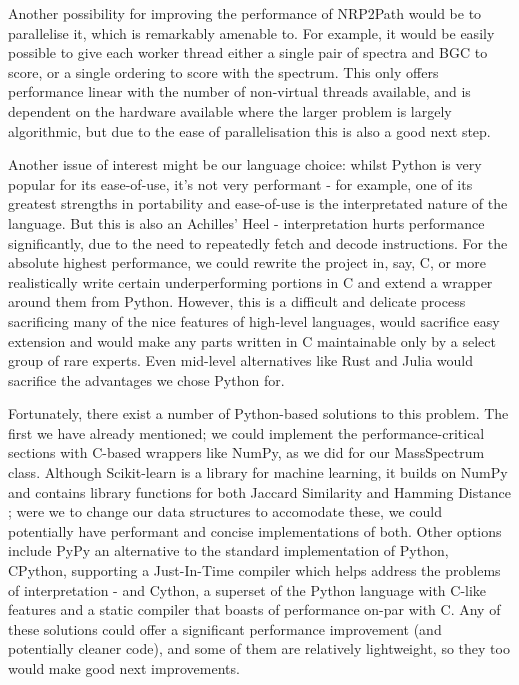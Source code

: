\documentclass{l4proj}
\newcommand{\cit}[1]{\citep{#1}}
\begin{document}
Another possibility for improving the performance of NRP2Path would be to parallelise it, which is remarkably amenable to. For example, it would be easily possible to give each worker thread either a single pair of spectra and BGC to score, or a single ordering to score with the spectrum. This only offers performance linear with the number of non-virtual threads available, and is dependent on the hardware available where the larger problem is largely algorithmic, but due to the ease of parallelisation this is also a good next step.

Another issue of interest might be our language choice: whilst Python is very popular for its ease-of-use, it's not very performant - for example, one of its greatest strengths in portability and ease-of-use is the interpretated nature of the language. But this is also an Achilles' Heel - interpretation hurts performance significantly, due to the need to repeatedly fetch and decode instructions. For the absolute highest performance, we could rewrite the project in, say, C, or more realistically write certain underperforming portions in C and extend a wrapper around them from Python. However, this is a difficult and delicate process sacrificing many of the nice features of high-level languages, would sacrifice easy extension and would make any parts written in C maintainable only by a select group of rare experts. Even mid-level alternatives like Rust \cit{rustlang} and Julia would sacrifice the advantages we chose Python for. 

Fortunately, there exist a number of Python-based solutions to this problem. The first we have already mentioned; we could implement the performance-critical sections with C-based wrappers like NumPy, as we did for our MassSpectrum class. Although Scikit-learn \cit{sklearn} is a library for machine learning, it builds on NumPy and contains library functions for both Jaccard Similarity \cit{skjaccard} and Hamming Distance \cit{skhamming}; were we to change our data structures to accomodate these, we could potentially have performant and concise implementations of both. Other options include PyPy \cit{pypy} an alternative to the standard implementation of Python, CPython, supporting a Just-In-Time compiler which helps address the problems of interpretation - and Cython, a superset of the Python language with C-like features and a static compiler that boasts of performance on-par with C. Any of these solutions could offer a significant performance improvement (and potentially cleaner code), and some of them are relatively lightweight, so they too would make good next improvements.
\end{document}
